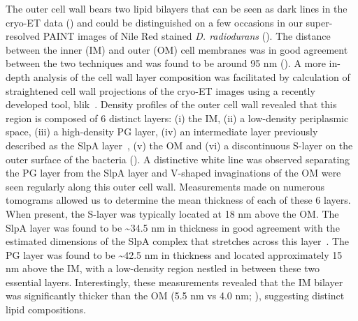 The outer cell wall bears two lipid bilayers that can be seen as dark lines in the cryo-ET data () and could be distinguished on a few occasions in our super-resolved PAINT images of Nile Red stained \textit{D. radiodurans} ().
The distance between the inner (IM) and outer (OM) cell membranes was in good agreement between the two techniques and was found to be around 95 nm ().
A more in-depth analysis of the cell wall layer composition was facilitated by calculation of straightened cell wall projections of the cryo-ET images using a recently developed tool, blik~\cite{gaifasBlikExtensible3D2024}.
Density profiles of the outer cell wall revealed that this region is composed of 6 distinct layers: (i) the IM, (ii) a low-density periplasmic space, (iii) a high-density PG layer, (iv) an intermediate layer previously described as the SlpA layer~\cite{vonkugelgenMultidomainConnectorLinks2022}, (v) the OM and (vi) a discontinuous S-layer on the outer surface of the bacteria ().
A distinctive white line was observed separating the PG layer from the SlpA layer and V-shaped invaginations of the OM were seen regularly along this outer cell wall.
Measurements made on numerous tomograms allowed us to determine the mean thickness of each of these 6 layers.
When present, the S-layer was typically located at 18 nm above the OM.
The SlpA layer was found to be \sim34.5 nm in thickness in good agreement with the estimated dimensions of the SlpA complex that stretches across this layer~\cite{vonkugelgenMultidomainConnectorLinks2022}.
The PG layer was found to be \sim42.5 nm in thickness and located approximately 15 nm above the IM, with a low-density region nestled in between these two essential layers.
Interestingly, these measurements revealed that the IM bilayer was significantly thicker than the OM (5.5 nm vs 4.0 nm; ), suggesting distinct lipid compositions.

